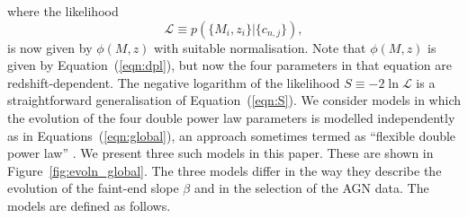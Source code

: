 \documentclass[fleqn,usenatbib]{mnras}
\begin{document}
where the likelihood 
\begin{equation}
  \mathcal{L}\equiv p(\{M_i, z_i\} | \{c_{n,j}\}),
\end{equation}
is now given by $\phi(M,z)$ with suitable normalisation.  Note that
$\phi(M,z)$ is given by Equation~(\ref{eqn:dpl}), but now the four
parameters in that equation are redshift-dependent.  The negative
logarithm of the likelihood $S\equiv -2\ln\mathcal{L}$ is a
straightforward generalisation of Equation~(\ref{eqn:S}).  We consider
models in which the evolution of the four double power law parameters
is modelled independently as in Equations~(\ref{eqn:global}), an
approach sometimes termed as ``flexible double power law''
\citep{2015MNRAS.451.1892A}.  We present three such models in this
paper.  These are shown in Figure~\ref{fig:evoln_global}.  The three
models differ in the way they describe the evolution of the faint-end
slope $\beta$ and in the selection of the AGN data.  The models are
defined as follows.
\end{document}

